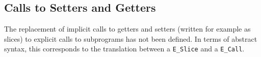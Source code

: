 







\subsection{Calls to Setters and Getters}
The replacement of implicit calls to getters and setters (written for example as
slices) to explicit calls to subprograms has not been defined.
%
In terms of abstract syntax, this corresponds to the translation between a
\texttt{E\_Slice} and a \texttt{E\_Call}.



